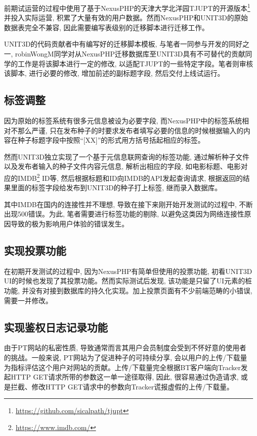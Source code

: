 前期试运营的过程中使用了基于NexusPHP的天津大学北洋园TJUPT的开源版本\footnote{\url{https://github.com/sicalpath/tjupt}}并投入实际运营, 积累了大量有效的用户数据。然而NexusPHP和UNIT3D的原始数据表完全不兼容, 因此需要编写表级别的迁移脚本进行迁移工作。

UNIT3D的代码贡献者中有编写好的迁移脚本模板, 与笔者一同参与开发的同好之一, robinWongM同学对从NexusPHP迁移数据库至UNIT3D具有不可替代的贡献同学的工作是将该脚本进行一定的修改, 以适配TJUPT的一些特定字段。笔者则审核该脚本, 进行必要的修改, 增加前述的副标题字段, 然后交付上线试运行。

\subsection{标签调整}

因为原始的标签系统有很多元信息被设为必要字段, 而NexusPHP中的标签系统相对不那么严谨, 只在发布种子的时要求发布者填写必要的信息的时候根据输入的内容在种子标题字段中按照``[XX]''的形式用方括号括起相应的标签。 

然而UNIT3D独立实现了一个基于元信息联网查询的标签功能, 通过解析种子文件以及发布者输入的种子文件内容元信息, 解析出相应的字段, 如电影标题、电影对应的IMDB\footnote{\url{https://www.imdb.com/}} ID等, 然后根据标题和ID向IMDB的API发起查询请求, 根据返回的结果里面的标签字段给发布到UNIT3D的种子打上标签, 继而录入数据库。

其中IMDB在国内的连接性并不理想, 导致在接下来刚开始开发测试的过程中, 不断出现500错误。为此, 笔者需要进行标签功能的剔除, 以避免这类因为网络连接性原因导致的极为影响用户体验的错误发生。

\subsection{实现投票功能}

在初期开发测试的过程中, 因为NexusPHP有简单但使用的投票功能, 初看UNIT3D UI的时候也发现了其投票功能。然而实际测试后发现, 该功能是只留了UI元素的桩功能, 并没有对接到数据库的持久化实现。加上投票页面有不少前端范畴的小错误, 需要一并修改。

\subsection{实现鉴权日志记录功能}
\label{subsec:auth}

由于PT网站的私密性质, 导致通常而言其用户会员制度会受到不怀好意的使用者的挑战。一般来说, PT网站为了促进种子的可持续分享, 会以用户的上传/下载量为指标评估这个用户对网站的贡献。上传/下载量完全根据BT客户端向Tracker发起HTTP GET请求所带的参数这一单一途径取得, 因此, 很容易通过伪造请求, 或是拦截、修改HTTP GET请求中的参数向Tracker谎报虚假的上传/下载量。

